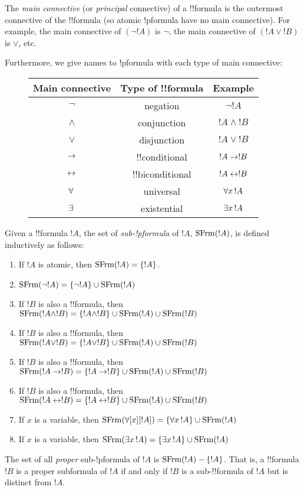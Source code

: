 \documentclass[open-logic-section]{subfiles}
\begin{document}
\begin{defn}
The \emph{main connective} (or \emph{principal} connective) of a
!!{formula} is the outermost connective of the !!{formula} (so atomic
!p{formula} have no main connective). For example, the main connective
of $(\lnot !A)$ is $\lnot$, the main connective of $(!A \lor !B)$ is
$\lor$, etc.

Furthermore, we give names to !p{formula} with each type of main connective:

\begin{figure}[!h]
\centering
\begin{tabular}{| c | c | c |}
\hline
Main connective & Type of !!{formula} & Example\\
\hline
$\lnot$ & negation & $\lnot !A$ \\
$\land$ & conjunction & $!A \land !B$ \\
$\lor$ & disjunction & $!A \lor !B$ \\
$\to$ & !!{conditional} & $!A \to !B$ \\
$\leftrightarrow$ & !!{biconditional} & $!A \leftrightarrow !B$ \\
$\lforall[][]$ & universal & $\lforall[x][!A]$ \\
$\lexists[][]$ & existential & $\lexists[x][!A]$\\ \hline
\end{tabular}
\end{figure}

\end{defn}

\begin{defn}
Given a !!{formula} $!A$, the set of \emph{sub-!p{formula}} of $!A$,
$\mathrm{SFrm}({!A})$, is defined inductively as follows:
\begin{enumerate}
\item If $!A$ is atomic, then $\mathrm{SFrm}({!A}) = \{!A\}$.
\item $\mathrm{SFrm}({\lnot !A}) = \{\lnot !A\} \cup \mathrm{SFrm}({!A})$
\item If $!B$ is also a !!{formula}, then $\mathrm{SFrm}({!A \land !B}) = \{!A
  \land !B\} \cup \mathrm{SFrm}({!A}) \cup \mathrm{SFrm}({!B})$
\item If $!B$ is also a !!{formula}, then $\mathrm{SFrm}({!A \lor !B}) = \{!A \lor
  !B\} \cup \mathrm{SFrm}({!A}) \cup \mathrm{SFrm}({!B})$
\item If $!B$ is also a !!{formula}, then $\mathrm{SFrm}({!A \to !B}) = \{!A \to
  !B\} \cup \mathrm{SFrm}({!A}) \cup \mathrm{SFrm}({!B})$
\item If $!B$ is also a !!{formula}, then $\mathrm{SFrm}({!A \leftrightarrow !B}) = \{!A
  \leftrightarrow !B\} \cup \mathrm{SFrm}({!A}) \cup \mathrm{SFrm}({!B})$
\item If $x$ is a variable, then $\SubFrm{\forall[x][!A]} =
  \{\lforall[x][!A]\} \cup \SubFrm{!A}$
\item If $x$ is a variable, then $\SubFrm{\lexists[x][!A]} =
  \{\lexists[x][!A]\} \cup \SubFrm{!A}$
\end{enumerate}
The set of all \emph{proper} sub-!p{formula} of $!A$ is $\mathrm{SFrm}({!A}) -
\{!A\}$. That is, a !!{formula} $!B$ is a proper subformula of $!A$ if and
only if $!B$ is a sub-!!{formula} of $!A$ but is distinct from $!A$.
\end{defn}
\end{document}

